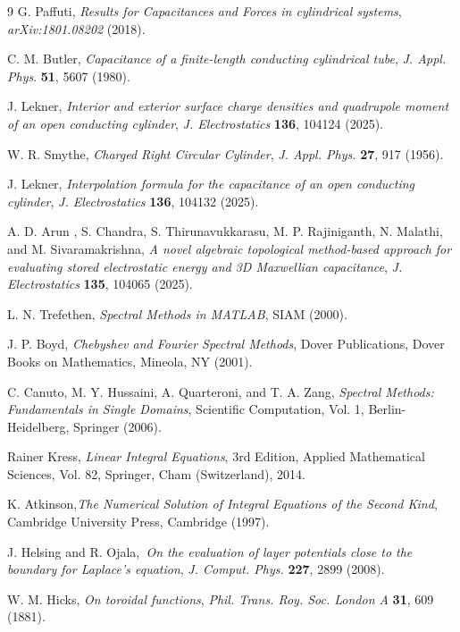 \documentclass[12pt]{article}
\begin{document}
\begin{thebibliography}{9}
G. Paffuti, \textit{Results for Capacitances and Forces in
cylindrical systems}, \emph{arXiv:1801.08202} (2018).

C. M. Butler, \textit{Capacitance of a finite-length conducting
cylindrical tube}, \emph{J. Appl. Phys}. \textbf{51}, 5607 (1980).

J. Lekner, \textit{Interior and exterior surface charge
densities and quadrupole moment of an open conducting cylinder}, \emph{J.
Electrostatics} \textbf{136}, 104124 (2025).

W. R. Smythe, \textit{Charged Right Circular Cylinder},
\emph{J. Appl. Phys.} \textbf{27}, 917 (1956).

J. Lekner, \textit{Interpolation formula for the capacitance of
an open conducting cylinder}, \emph{J. Electrostatics} \textbf{136}, 104132 (2025).

A. D. Arun , S. Chandra, S. Thirunavukkarasu, M. P.
Rajiniganth, N. Malathi, and M. Sivaramakrishna, \textit{A novel algebraic
topological method-based approach for evaluating stored electrostatic energy
and 3D Maxwellian capacitance}, \emph{J. Electrostatics} \textbf{135}, 104065 (2025).

L. N. Trefethen, \textit{Spectral Methods in MATLAB}, SIAM (2000).

J. P. Boyd, \textit{Chebyshev and Fourier Spectral Methods},
Dover Publications, Dover Books on Mathematics, Mineola, NY (2001).

C. Canuto, M. Y. Hussaini, A. Quarteroni, and T. A. Zang,
\textit{Spectral Methods: Fundamentals in Single Domains}, Scientific
Computation, Vol. 1, Berlin-Heidelberg, Springer (2006).

Rainer Kress, \textit{Linear Integral Equations}, 3rd Edition,
Applied Mathematical Sciences, Vol. 82, Springer, Cham (Switzerland), 2014.

K. Atkinson,\textit{The Numerical Solution of Integral Equations
of the Second Kind}, Cambridge University Press, Cambridge (1997).

J. Helsing and R. Ojala,\textit{\ On the evaluation of layer
potentials close to the boundary for Laplace's equation}, \emph{J. Comput.
Phys.} \textbf{227}, 2899 (2008).

W. M. Hicks, \textit{On toroidal functions}, \emph{Phil. Trans.
Roy. Soc. London A} \textbf{31}, 609 (1881).


\end{thebibliography}
\end{document}
